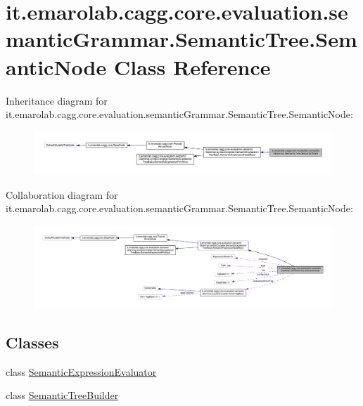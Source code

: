 \hypertarget{classit_1_1emarolab_1_1cagg_1_1core_1_1evaluation_1_1semanticGrammar_1_1SemanticTree_1_1SemanticNode}{\section{it.\-emarolab.\-cagg.\-core.\-evaluation.\-semantic\-Grammar.\-Semantic\-Tree.\-Semantic\-Node Class Reference}
\label{classit_1_1emarolab_1_1cagg_1_1core_1_1evaluation_1_1semanticGrammar_1_1SemanticTree_1_1SemanticNode}
}


Inheritance diagram for it.\-emarolab.\-cagg.\-core.\-evaluation.\-semantic\-Grammar.\-Semantic\-Tree.\-Semantic\-Node\-:\nopagebreak
\begin{figure}[H]
\begin{center}
\leavevmode
\includegraphics[width=350pt]{classit_1_1emarolab_1_1cagg_1_1core_1_1evaluation_1_1semanticGrammar_1_1SemanticTree_1_1SemanticNode__inherit__graph}
\end{center}
\end{figure}


Collaboration diagram for it.\-emarolab.\-cagg.\-core.\-evaluation.\-semantic\-Grammar.\-Semantic\-Tree.\-Semantic\-Node\-:\nopagebreak
\begin{figure}[H]
\begin{center}
\leavevmode
\includegraphics[width=350pt]{classit_1_1emarolab_1_1cagg_1_1core_1_1evaluation_1_1semanticGrammar_1_1SemanticTree_1_1SemanticNode__coll__graph}
\end{center}
\end{figure}
\subsection*{Classes}
\begin{DoxyCompactItemize}
\item 
class \hyperlink{classit_1_1emarolab_1_1cagg_1_1core_1_1evaluation_1_1semanticGrammar_1_1SemanticTree_1_1Semantic4c3f840cd671383fb305cb0305b7229f}{Semantic\-Expression\-Evaluator}
\item 
class \hyperlink{classit_1_1emarolab_1_1cagg_1_1core_1_1evaluation_1_1semanticGrammar_1_1SemanticTree_1_1SemanticNode_1_1SemanticTreeBuilder}{Semantic\-Tree\-Builder}
\end{DoxyCompactItemize}
